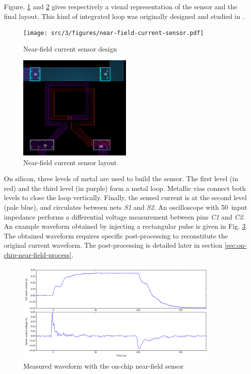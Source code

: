 Figure. \ref{fig:near-field-current-sensor} and \ref{fig:near-field-current-sensor-layout} gives respectively a visual representation of the sensor and the final layout.
This kind of integrated loop was originally designed and studied in \cite{AlainSallesInductors}.

\begin{figure}[!h]
  \centering
  \texttt{[image: src/3/figures/near-field-current-sensor.pdf]}
  \caption{Near-field current sensor design}
  \label{fig:near-field-current-sensor}
\end{figure}

\begin{figure}[!h]
  \centering
  \includegraphics[width=0.5\textwidth]{src/3/figures/sensor_layout.png}
  \caption{Near-field current sensor layout}
  \label{fig:near-field-current-sensor-layout}
\end{figure}

On silicon, three levels of metal are used to build the sensor.
The first level (in red) and the third level (in purple) form a metal loop.
Metallic vias connect both levels to close the loop vertically.
Finally, the sensed current is at the second level (pale blue), and circulates between nets \textit{S1} and \textit{S2}.
An oscilloscope with 50\textOmega\ input impedance performs a differential voltage measurement between pins \textit{C1} and \textit{C2}.
An example waveform obtained by injecting a rectangular pulse is given in Fig. \ref{fig:nfs-wvf}.
The obtained waveform requires specific post-processing to reconstitute the original current waveform.
The post-processing is detailed later in section \ref{sec:on-chip-near-field-process}.

\begin{figure}[!h]
  \centering
  \includegraphics[width=0.9\textwidth]{src/3/figures/measured_waveform.png}
  \caption{Measured waveform with the on-chip near-field sensor}
  \label{fig:nfs-wvf}
\end{figure}

